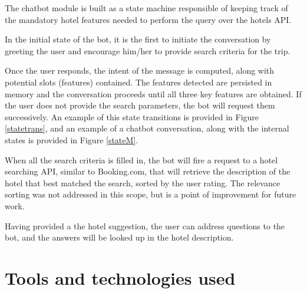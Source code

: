 \documentclass[runningheads,a4paper,11pt]{report}
\begin{document}
The chatbot module is built as a state machine responsible of keeping track of the mandatory hotel features needed to perform the query over the hotels API. 

In the initial state of the bot, it is the first to initiate the conversation by greeting the user and encourage him/her to provide search criteria for the trip. 

Once the user responds, the intent of the message is computed, along with potential slots (features) contained. 
The features detected are persisted in memory and the conversation proceeds until all three key features are obtained. If the user does not provide the search parameters, the bot will request them successively. An example of this state transitions is provided in Figure \ref{statetrans}, and an example of a chatbot conversation, along with the internal states is provided in Figure \ref{stateM}.

When all the search criteria is filled in, the bot will fire a request to a hotel searching API, similar to Booking.com, that will retrieve the description of the hotel that best matched the search, sorted by the user rating. The relevance sorting was not addressed in this scope, but is a point of improvement for future work.

Having provided a the hotel suggestion, the user can address questions to the bot, and the answers will be looked up in the hotel description.


\section{Tools and technologies used}
\label{section:tools}
\end{document}
